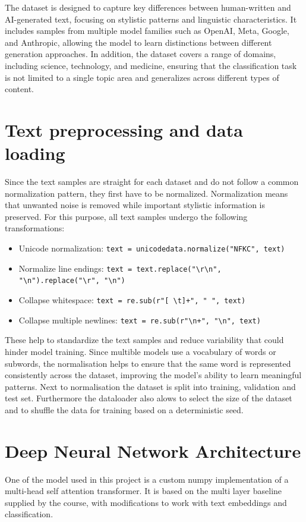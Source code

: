 \documentclass[11pt,a4paper]{article}
\begin{document}
The dataset is designed to capture key differences between human-written and AI-generated text, focusing on stylistic patterns and linguistic characteristics. It includes samples from multiple model families such as OpenAI, Meta, Google, and Anthropic, allowing the model to learn distinctions between different generation approaches. In addition, the dataset covers a range of domains, including science, technology, and medicine, ensuring that the classification task is not limited to a single topic area and generalizes across different types of content.

\section{Text preprocessing and data loading}
    Since the text samples are straight for each dataset and do not follow a common normalization pattern, they first have to be normalized.
 Normalization means that unwanted noise is removed while important stylistic information is preserved.
    For this purpose, all text samples undergo the following transformations:
    \begin{itemize}
    \label{normalisation}
    \item Unicode normalization: \verb|text = unicodedata.normalize("NFKC", text)|
    \item Normalize line endings: \verb|text = text.replace("\r\n", "\n").replace("\r", "\n")|
    \item Collapse whitespace: \verb|text = re.sub(r"[ \t]+", " ", text)|
    \item Collapse multiple newlines: \verb|text = re.sub(r"\n+", "\n", text)|
    \end{itemize}
    These help to standardize the text samples and reduce variability that could hinder model training.
    Since multible models use a vocabulary of words or subwords, the normalisation helps to ensure that the same word is represented consistently across the dataset, improving the model's ability to learn meaningful patterns.
    Next to normalisation the dataset is split into training, validation and test set.
    Furthermore the dataloader also alows to select the size of the dataset and to shuffle the data for training based on a deterministic seed.
    \section{Deep Neural Network Architecture}
    One of the model used in this project is a custom numpy implementation of a multi-head self attention transformer.
    It is based on the multi layer baseline supplied by the course, with modifications to work with text embeddings and classification.
\end{document}
